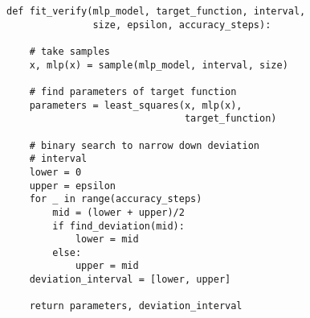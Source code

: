 \begin{lstlisting}[caption={Method to fit parameters and find a deviation interval}, label=lst:fit_verify, mathescape=true]
def fit_verify(mlp_model, target_function, interval, 
               size, epsilon, accuracy_steps):

    # take samples
    x, mlp(x) = sample(mlp_model, interval, size)

    # find parameters of target function
    parameters = least_squares(x, mlp(x), 
                               target_function)

    # binary search to narrow down deviation 
    # interval
    lower = 0
    upper = epsilon
    for _ in range(accuracy_steps)
        mid = (lower + upper)/2
        if find_deviation(mid):
            lower = mid
        else:
            upper = mid
    deviation_interval = [lower, upper]

    return parameters, deviation_interval
\end{lstlisting}